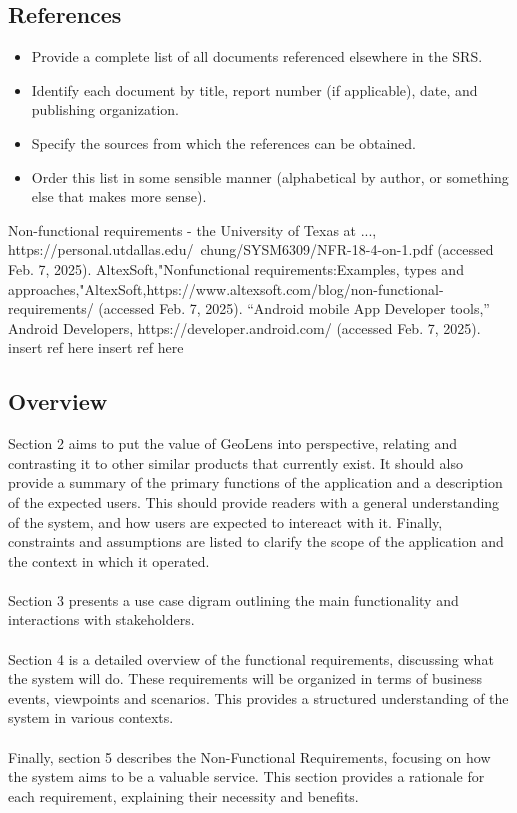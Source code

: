 \documentclass[]{article}
\begin{document}
\subsection{References}
\label{sub:references}
\begin{itemize}
	\item Provide a complete list of all documents referenced elsewhere in the SRS.
	\item Identify each document by title, report number (if applicable), date, and publishing organization.
	\item Specify the sources from which the references can be obtained.
	\item Order this list in some sensible manner (alphabetical by author, or something else that makes more sense).
\end{itemize}

\begin{thebibliography}{9}
     Non-functional requirements - the University of Texas at ..., https://personal.utdallas.edu/~chung/SYSM6309/NFR-18-4-on-1.pdf (accessed Feb. 7, 2025).
     AltexSoft,"Nonfunctional requirements:Examples, types and approaches,"AltexSoft,https://www.altexsoft.com/blog/non-functional-requirements/ (accessed Feb. 7, 2025).
     “Android mobile App Developer tools,” Android Developers, https://developer.android.com/ (accessed Feb. 7, 2025). 
	 insert ref here
	 insert ref here
\end{thebibliography}

\subsection{Overview}
\label{sub:overview}
Section 2 aims to put the value of GeoLens into perspective, relating and contrasting it to other similar products that currently exist.
It should also provide a summary of the primary functions of the application and a description of the expected users. This should provide readers with a general understanding
of the system, and how users are expected to intereact with it. Finally, constraints and assumptions are listed to clarify the scope of the application and the context in which it operated.\\\\
Section 3 presents a use case digram outlining the main functionality and interactions with stakeholders.\\\\
Section 4 is a detailed overview of the functional requirements, discussing what the system will do. These requirements will be organized in terms of 
business events, viewpoints and scenarios. This provides a structured understanding of the system in various contexts. \\\\
Finally, section 5 describes the Non-Functional Requirements, focusing on how the system aims to be a valuable service. This section provides a rationale for each requirement, explaining their necessity and benefits.
\end{document}
